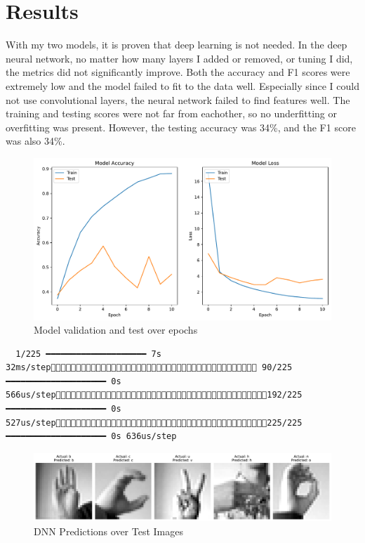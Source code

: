 \documentclass[
  letterpaper,
  DIV=11,
  numbers=noendperiod]{scrartcl}
\begin{document}
\section{Results}\label{results}

With my two models, it is proven that deep learning is not needed. In
the deep neural network, no matter how many layers I added or removed,
or tuning I did, the metrics did not significantly improve. Both the
accuracy and F1 scores were extremely low and the model failed to fit to
the data well. Especially since I could not use convolutional layers,
the neural network failed to find features well. The training and
testing scores were not far from eachother, so no underfitting or
overfitting was present. However, the testing accuracy was 34\%, and the
F1 score was also 34\%.

\begin{figure}

{\centering \includegraphics{HW2_Reflection_files/figure-pdf/model_output_dnn_graph-output-1.pdf}

}

\caption{Model validation and test over epochs}

\end{figure}%

\begin{verbatim}
  1/225 ━━━━━━━━━━━━━━━━━━━━ 7s 32ms/step 90/225 ━━━━━━━━━━━━━━━━━━━━ 0s 566us/step192/225 ━━━━━━━━━━━━━━━━━━━━ 0s 527us/step225/225 ━━━━━━━━━━━━━━━━━━━━ 0s 636us/step
\end{verbatim}

\begin{figure}

{\centering \includegraphics{HW2_Reflection_files/figure-pdf/model_output_dnn_images-output-2.pdf}

}

\caption{DNN Predictions over Test Images}

\end{figure}%
\end{document}
